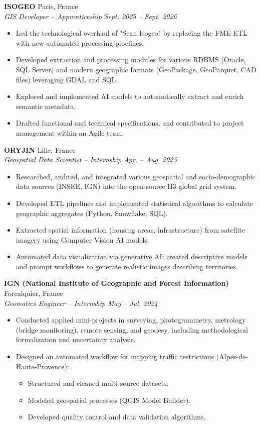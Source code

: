 \documentclass[11pt, a4paper]{article}
\newcommand{\cventry}[4]{
    \vspace{0.1cm}
    \noindent \textbf{#1} \hfill #2 \\
    \noindent \textit{#3} \hfill \textit{#4} \par
    \vspace{0.05cm}
}
\begin{document}
\cventry{ISOGEO}{Paris, France}{GIS Developer -- Apprenticeship}{Sept. 2025 -- Sept. 2026}
\begin{itemize}[leftmargin=0.5cm, nosep]
    \item Led the technological overhaul of "Scan Isogeo" by replacing the FME ETL with new automated processing pipelines.
    \item Developed extraction and processing modules for various RDBMS (Oracle, SQL Server) and modern geographic formats (GeoPackage, GeoParquet, CAD files) leveraging GDAL and SQL.
    \item Explored and implemented AI models to automatically extract and enrich semantic metadata.
    \item Drafted functional and technical specifications, and contributed to project management within an Agile team.
\end{itemize}

\cventry{ORYJIN}{Lille, France}{Geospatial Data Scientist -- Internship}{Apr. -- Aug. 2025}
\begin{itemize}[leftmargin=0.5cm, nosep]
    \item Researched, audited, and integrated various geospatial and socio-demographic data sources (INSEE, IGN) into the open-source H3 global grid system.
    \item Developed ETL pipelines and implemented statistical algorithms to calculate geographic aggregates (Python, Snowflake, SQL).
    \item Extracted spatial information (housing areas, infrastructure) from satellite imagery using Computer Vision AI models.
    \item Automated data visualization via generative AI: created descriptive models and prompt workflows to generate realistic images describing territories.
\end{itemize}

\cventry{IGN (National Institute of Geographic and Forest Information)}{Forcalquier, France}{Geomatics Engineer -- Internship}{May -- Jul. 2024}
\begin{itemize}[leftmargin=0.5cm, nosep]
    \item Conducted applied mini-projects in surveying, photogrammetry, metrology (bridge monitoring), remote sensing, and geodesy, including methodological formalization and uncertainty analysis.
    \item Designed an automated workflow for mapping traffic restrictions (Alpes-de-Haute-Provence):
    \begin{itemize}[leftmargin=0.5cm, nosep]
        \item Structured and cleaned multi-source datasets.
        \item Modeled geospatial processes (QGIS Model Builder).
        \item Developed quality control and data validation algorithms.
    \end{itemize}
\end{itemize}
\end{document}
